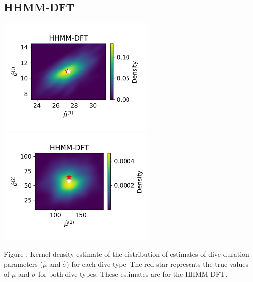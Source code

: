 \documentclass{article}
\begin{document}
        \subsection{HHMM-DFT}
        \begin{center}
        \includegraphics[width=3in]{../Plots/hhmm_FV_uncorr_MLE_density_dive_duration_-1_0.png}
        \includegraphics[width=3in]{../Plots/hhmm_FV_uncorr_MLE_density_dive_duration_-1_1.png}
        \end{center}

        \noindent Figure : Kernel density estimate of the distribution of estimates of dive duration parameters ($\hat \mu$ and $\hat \sigma$) for each dive type. The red star represents the true values of $\mu$ and $\sigma$ for both dive types. These estimates are for the HHMM-DFT.
        \addtocounter{fignum}{1}
        
\end{document}
